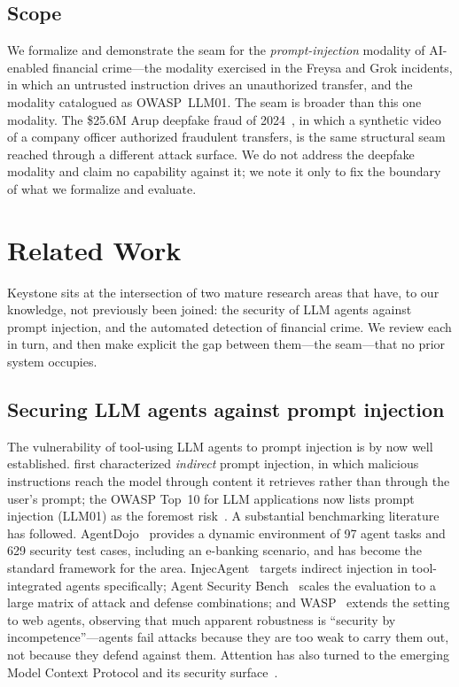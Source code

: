 \documentclass[10pt,twocolumn]{article}
\begin{document}
\subsection{Scope}
\label{sec:scope}

We formalize and demonstrate the seam for the \emph{prompt-injection} modality
of AI-enabled financial crime---the modality exercised in the Freysa and Grok
incidents, in which an untrusted instruction drives an unauthorized transfer,
and the modality catalogued as OWASP~LLM01. The seam is broader than this one
modality. The \$25.6M Arup deepfake fraud of 2024~\cite{arup}, in which a
synthetic video of a company officer authorized fraudulent transfers, is the
same structural seam reached through a different attack surface. We do not
address the deepfake modality and claim no capability against it; we note it
only to fix the boundary of what we formalize and evaluate.



\section{Related Work}\label{sec:related}

Keystone sits at the intersection of two mature research areas that have,
to our knowledge, not previously been joined: the security of LLM agents
against prompt injection, and the automated detection of financial crime.
We review each in turn, and then make explicit the gap between them---the
seam---that no prior system occupies.

\subsection{Securing LLM agents against prompt injection}

The vulnerability of tool-using LLM agents to prompt injection is by now
well established. \citet{greshake} first characterized \emph{indirect} prompt
injection, in which malicious instructions reach the model through content it
retrieves rather than through the user's prompt; the OWASP Top~10 for LLM
applications now lists prompt injection (LLM01) as the foremost
risk~\cite{owasp}. A substantial benchmarking literature has followed.
AgentDojo~\cite{agentdojo} provides a dynamic environment of 97 agent tasks
and 629 security test cases, including an e-banking scenario, and has become
the standard framework for the area. InjecAgent~\cite{injecagent} targets
indirect injection in tool-integrated agents specifically; Agent Security
Bench~\cite{asb} scales the evaluation to a large matrix of attack and defense
combinations; and WASP~\cite{wasp} extends the setting to web agents, observing
that much apparent robustness is ``security by incompetence''---agents fail
attacks because they are too weak to carry them out, not because they defend
against them. Attention has also turned to the emerging Model Context Protocol
and its security surface~\cite{mcpsecurity}.
\end{document}
